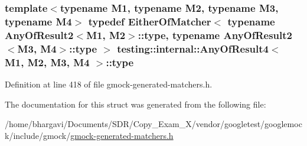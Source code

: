 \subsubsection[{\texorpdfstring{type}{type}}]{\setlength{\rightskip}{0pt plus 5cm}template$<$typename M1, typename M2, typename M3, typename M4$>$ typedef {\bf Either\+Of\+Matcher}$<$ typename {\bf Any\+Of\+Result2}$<$M1, M2$>$\+::{\bf type}, typename {\bf Any\+Of\+Result2}$<$M3, M4$>$\+::{\bf type} $>$ {\bf testing\+::internal\+::\+Any\+Of\+Result4}$<$ M1, M2, M3, M4 $>$\+::{\bf type}}\hypertarget{structtesting_1_1internal_1_1_any_of_result4_a4f3c9aebb4f7fc24287b59a0bdf1a4a6}{}\label{structtesting_1_1internal_1_1_any_of_result4_a4f3c9aebb4f7fc24287b59a0bdf1a4a6}


Definition at line 418 of file gmock-\/generated-\/matchers.\+h.



The documentation for this struct was generated from the following file\+:\begin{DoxyCompactItemize}
\item 
/home/bhargavi/\+Documents/\+S\+D\+R/\+Copy\+\_\+\+Exam\+\_\+X/vendor/googletest/googlemock/include/gmock/\hyperlink{gmock-generated-matchers_8h}{gmock-\/generated-\/matchers.\+h}\end{DoxyCompactItemize}
